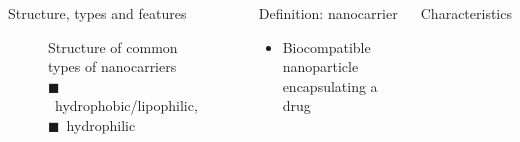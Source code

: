 \documentclass[aspectratio=169,compress]{beamer}
\newcommand*{\autotitle}{\subsecname\hfill\textbf{\small\secname}}
\begin{document}
\begin{frame}[fragile]{\autotitle}
\begin{columns}
\begin{block}{Structure, types and features}
\begin{figure}[h]
          \caption{Structure of common types of nanocarriers\\
            \textcolor{palatinate!}{$\blacksquare$~hydrophobic/lipophilic},
            \textcolor{blue-palatinate!}{$\blacksquare$~hydrophilic}}
        \end{figure}
      \end{block}

      \begin{block}{Definition: nanocarrier}
        \begin{itemize}
          \item Biocompatible nanoparticle encapsulating a drug
        \end{itemize}
      \end{block}

      \begin{block}{Characteristics}
      \end{block}

  \end{columns}
\end{frame}
\end{document}
